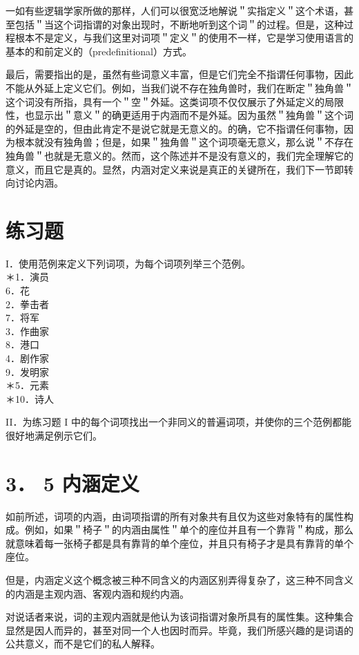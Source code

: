 一如有些逻辑学家所做的那样，人们可以很宽泛地解说＂实指定义＂这个术语，甚至包括＂当这个词指谓的对象出现时，不断地听到这个词＂的过程。但是，这种过程根本不是定义，与我们这里对词项＂定义＂的使用不一样，它是学习使用语言的基本的和前定义的（predefinitional）方式。

最后，需要指出的是，虽然有些词意义丰富，但是它们完全不指谓任何事物，因此不能从外延上定义它们。例如，当我们说不存在独角兽时，我们在断定＂独角兽＂这个词没有所指，具有一个＂空＂外延。这类词项不仅仅展示了外延定义的局限性，也显示出＂意义＂的确更适用于内涵而不是外延。因为虽然＂独角兽＂这个词的外延是空的，但由此肯定不是说它就是无意义的。的确，它不指谓任何事物，因为根本就没有独角兽；但是，如果＂独角兽＂这个词项毫无意义，那么说＂不存在独角兽＂也就是无意义的。然而，这个陈述并不是没有意义的，我们完全理解它的意义，而且它是真的。显然，内涵对定义来说是真正的关键所在，我们下一节即转向讨论内涵。

\section*{练习题}
I．使用范例来定义下列词项，为每个词项列举三个范例。\\
＊1．演员\\
6．花\\
2．拳击者\\
7．将军\\
3．作曲家\\
8．港口\\
4．剧作家\\
9．发明家\\
＊5．元素\\
＊10．诗人

II．为练习题 I 中的每个词项找出一个非同义的普遍词项，并使你的三个范例都能很好地满足例示它们。

\section*{3． 5 内涵定义}
如前所述，词项的内涵，由词项指谓的所有对象共有且仅为这些对象特有的属性构成。例如，如果＂椅子＂的内涵由属性＂单个的座位并且有一个靠背＂构成，那么就意味着每一张椅子都是具有靠背的单个座位，并且只有椅子才是具有靠背的单个座位。

但是，内涵定义这个概念被三种不同含义的内涵区别弄得复杂了，这三种不同含义的内涵是主观内涵、客观内涵和规约内涵。

对说话者来说，词的主观内涵就是他认为该词指谓对象所具有的属性集。这种集合显然是因人而异的，甚至对同一个人也因时而异。毕竟，我们所感兴趣的是词语的公共意义，而不是它们的私人解释。

